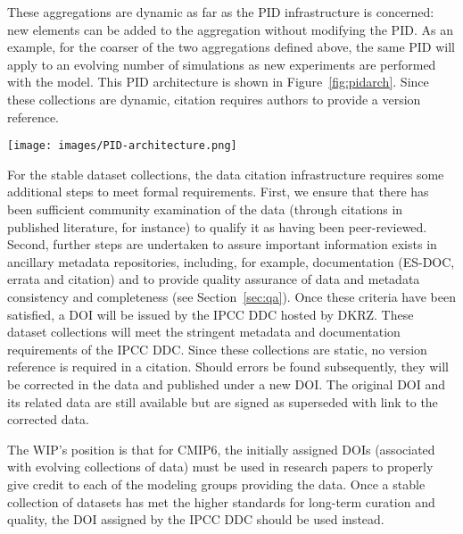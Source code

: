 \documentclass[gmd,manuscript]{copernicus}
\newcommand{\pllabel}[1]{\label{p-#1}\linelabel{l-#1}}
\begin{document}
These aggregations are dynamic as far as the PID infrastructure is
concerned: new elements can be added to the aggregation without
modifying the PID. As an example, for the coarser of the two
aggregations defined above, the same PID will apply to an evolving
number of simulations as new experiments are performed with the model.
This PID architecture is shown in Figure~\ref{fig:pidarch}. Since these
collections are dynamic, citation requires authors to provide a
version reference.

\begin{figure*}
  \begin{center}
    \texttt{[image: images/PID-architecture.png]}
  \end{center}
  \caption{Schematic PID architecture, showing layers in the PID
    hierarchy. In the lower layers of the hierarchy, PIDs are static
    once generated, and new datasets generate new versions with new
    PIDs. Each file carries a PID and each collection (dataset,
    simulation, ..) is related to a PID. Resolving the PID in the
    Handle server guides the user to the file or the landing page
    describing the collection. Each box in the figure will be
    addressed uniquely by its PID.}
  \label{fig:pidarch}
\end{figure*}

For the stable dataset collections, the data citation infrastructure
requires some additional steps to meet formal requirements. First, we
ensure that there has been sufficient community examination of the
data
\pllabel{RC1-40}
(through citations in published literature, for instance) to qualify
it as having been peer-reviewed. Second, further steps are undertaken
to assure important information exists in ancillary metadata
repositories, including, for example, documentation (ES-DOC, errata
and citation) and to provide quality assurance of data and metadata
consistency and completeness (see Section~\ref{sec:qa}). Once these
criteria have been satisfied, a DOI will be issued by the IPCC DDC
hosted by DKRZ. These dataset collections will meet the stringent
metadata and documentation requirements of the IPCC DDC. Since these
collections are static, no version reference is required in a
citation.
\pllabel{RC1-41}
Should errors be found subsequently, they will be corrected in the
data and published under a new DOI. The original DOI and its related
data are still available but are signed as superseded with link to the
corrected data.

The WIP's position is that for CMIP6, the initially assigned DOIs
(associated with evolving collections of data) must be used in
research papers to properly give credit to each of the modeling groups
providing the data. Once a stable collection of datasets has met the
higher standards for long-term curation and quality, the DOI assigned
by the IPCC DDC should be used instead.
\end{document}
